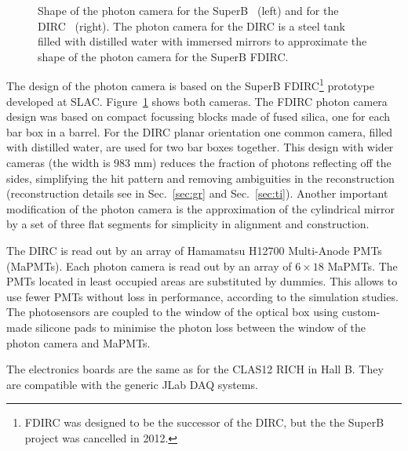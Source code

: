 \begin{figure}[!h]
\begin{minipage}{0.4\textwidth}
\vspace{0.5cm}
\end{minipage}
\caption{\label{pic:ob} Shape of the photon camera for the SuperB~\cite{fdirc} (left) and for the \gluex DIRC~\cite{tdr} (right). The photon camera for the \gluex DIRC is a steel tank filled with distilled water with immersed mirrors to approximate the shape of the photon camera for the SuperB FDIRC.}
\end{figure}

The design of the photon camera is based on the SuperB FDIRC\footnote{FDIRC was designed to be the successor of the \babar DIRC, but the the SuperB project was cancelled in 2012.} prototype~\cite{fdirc} developed at SLAC. Figure~\ref{pic:ob} shows both cameras. The FDIRC photon camera design was based on compact focussing blocks made of fused silica, one for each bar box in a barrel. For the \gluex DIRC planar orientation one common camera, filled with distilled water, are used for two bar boxes together. This design with wider cameras (the width is $983$ mm) reduces the fraction of photons reflecting off the sides, simplifying the hit pattern and removing ambiguities in the reconstruction (reconstruction details see in Sec.~\ref{sec:gr} and Sec.~\ref{sec:ti}). Another important modification of the photon camera is the approximation of the cylindrical mirror by a set of three flat segments for simplicity in alignment and construction. 

The \gluex DIRC is read out by an array of Hamamatsu H12700 Multi-Anode PMTs (MaPMTs). Each photon camera is read out by an array of $6 \times 18$ MaPMTs. The PMTs located in least occupied areas are substituted by dummies. This allows to use fewer PMTs without loss in performance, according to the simulation studies. The photosensors are coupled to the window of the optical box using custom-made silicone pads to minimise the photon loss between the window of the photon camera and MaPMTs. 

The electronics boards are the same as for the CLAS12 RICH in Hall B. They are compatible with the generic JLab DAQ systems.
